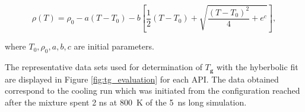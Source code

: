 \begin{equation}\label{eq:fit}
	\rho(T)=\rho_0-a\left(T-T_0\right)-b\left[\frac{1}{2}\left(T-T_0\right)+\sqrt{\frac{\left(T-T_0\right)^2}{4}+e^c}\right],
\end{equation}

where $T_0, \rho_0, a, b, c$ are initial parameters.

\vspace{-0.3cm}
The representative data sets used for determination of $T_\textbf{g}$ with the hyberbolic fit are displayed in Figure \ref{fig:tg_evaluation} for each API. The data obtained correspond to the cooling run which was initiated from the configuration reached after the mixture spent 2 ns at 800~K of the 5~ns long simulation. \vspace{-0.5cm}
\begin{figure}[H]
	\centering
	\\

\end{figure}
